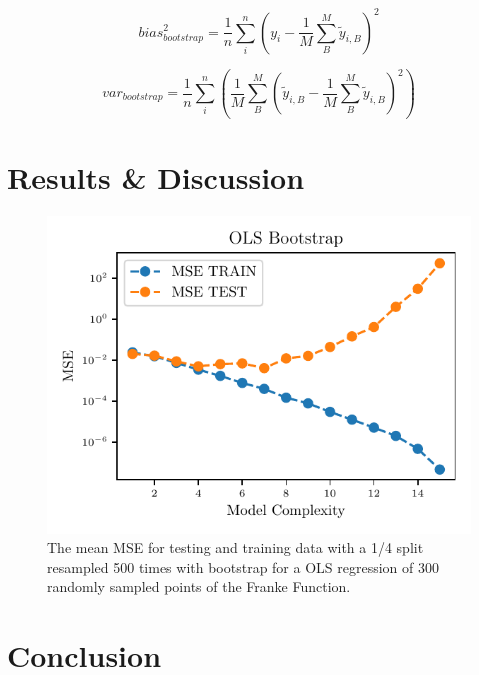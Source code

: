 \documentclass[reprint, english, nofootinbib]{revtex4-2}
\begin{document}
        \begin{equation}
        \label{bootstrap_bias}
        bias^2_{bootstrap} = \frac{1}{n} \sum^{n}_{i} (y_{i} - \frac{1}{M}\sum^{M}_{B} \tilde{y}_{i,B})^2
        \end{equation}

        \begin{equation}
        \label{bootstrap_variance}
        var_{bootstrap} = \frac{1}{n} \sum^{n}_{i} (\frac{1}{M}\sum^{M}_{B} (\tilde{y}_{i,B} - \frac{1}{M}\sum^{M}_{B} \tilde{y}_{i,B})^2)
        \end{equation}


\section{Results \& Discussion}

    \begin{figure}[h!tb]
        \center
        \includegraphics[width=\columnwidth]{../figs/OLS_MSE_Bootstrap_Hastie_211.pdf}
        \caption{\label{fig:Hastie2.11 MSE Bootstrap}The mean MSE for testing and training data with a 1/4 split resampled 500 times with bootstrap for a OLS regression of 300 randomly sampled points of the Franke Function.}
    \end{figure}


\section{Conclusion}

\onecolumngrid

\newpage
\twocolumngrid
\appendix
\end{document}
